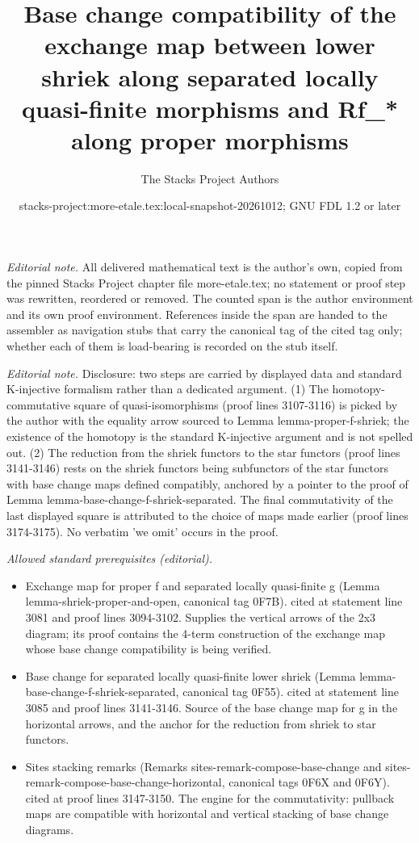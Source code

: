 \documentclass{stacks-project}
\title{Base change compatibility of the exchange map between lower shriek along separated locally quasi-finite morphisms and Rf\_* along proper morphisms}
\author{The Stacks Project Authors}
\date{stacks-project:more-etale.tex:local-snapshot-20261012; GNU FDL 1.2 or later}
\theoremstyle{plain}
\theoremstyle{definition}
\theoremstyle{remark}
\numberwithin{equation}{subsection}
\begin{document}
\maketitle
\setcounter{subsection}{1}
\noindent\textit{Editorial note.} All delivered mathematical text is the author's own, copied from the pinned Stacks Project chapter file more-etale.tex; no statement or proof step was rewritten, reordered or removed. The counted span is the author environment and its own proof environment. References inside the span are handed to the assembler as navigation stubs that carry the canonical tag of the cited tag only; whether each of them is load-bearing is recorded on the stub itself.\par\medskip
\noindent\textit{Editorial note.} Disclosure: two steps are carried by displayed data and standard K-injective formalism rather than a dedicated argument. (1) The homotopy-commutative square of quasi-isomorphisms (proof lines 3107-3116) is picked by the author with the equality arrow sourced to Lemma lemma-proper-f-shriek; the existence of the homotopy is the standard K-injective argument and is not spelled out. (2) The reduction from the shriek functors to the star functors (proof lines 3141-3146) rests on the shriek functors being subfunctors of the star functors with base change maps defined compatibly, anchored by a pointer to the proof of Lemma lemma-base-change-f-shriek-separated. The final commutativity of the last displayed square is attributed to the choice of maps made earlier (proof lines 3174-3175). No verbatim 'we omit' occurs in the proof.\par\medskip
\noindent\textit{Allowed standard prerequisites (editorial).}\begin{itemize}
\item Exchange map for proper f and separated locally quasi-finite g (Lemma lemma-shriek-proper-and-open, canonical tag 0F7B). cited at statement line 3081 and proof lines 3094-3102. Supplies the vertical arrows of the 2x3 diagram; its proof contains the 4-term construction of the exchange map whose base change compatibility is being verified.
\item Base change for separated locally quasi-finite lower shriek (Lemma lemma-base-change-f-shriek-separated, canonical tag 0F55). cited at statement line 3085 and proof lines 3141-3146. Source of the base change map for g in the horizontal arrows, and the anchor for the reduction from shriek to star functors.
\item Sites stacking remarks (Remarks sites-remark-compose-base-change and sites-remark-compose-base-change-horizontal, canonical tags 0F6X and 0F6Y). cited at proof lines 3147-3150. The engine for the commutativity: pullback maps are compatible with horizontal and vertical stacking of base change diagrams.
\end{itemize}\medskip
\end{document}
